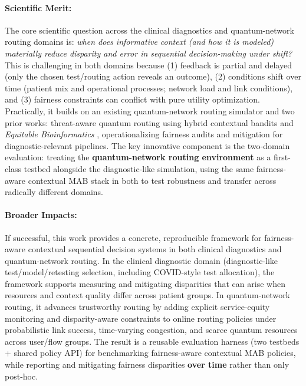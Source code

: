 \documentclass[12pt]{article}
\begin{document}
\paragraph{Scientific Merit:} \hspace{-5mm}
The core scientific question across the clinical diagnostics and quantum-network routing domains is: {\it when does informative context (and how it is modeled) materially reduce disparity and error in sequential decision-making under shift?} This is challenging in both domains because (1) feedback is partial and delayed (only the chosen test/routing action reveals an outcome), (2) conditions shift over time (patient mix and operational processes; network load and link conditions), and (3) fairness constraints can conflict with pure utility optimization. Practically, it builds on an existing quantum-network routing simulator and two prior works: threat-aware quantum routing using hybrid contextual bandits \cite{garcia2026threat_aware_quantum_routing} and {\it Equitable Bioinformatics} \cite{iste780_equitas}, operationalizing fairness audits and mitigation for diagnostic-relevant pipelines. The key innovative component is the two-domain evaluation: treating the {\bf quantum-network routing environment} as a first-class testbed alongside the diagnostic-like simulation, using the same fairness-aware contextual MAB stack in both to test robustness and transfer across radically different domains.


\paragraph{Broader Impacts:} \hspace{-5mm}
If successful, this work provides a concrete, reproducible framework for fairness-aware contextual sequential decision systems in both clinical diagnostics and quantum-network routing. In the clinical diagnostic domain (diagnostic-like test/model/retesting selection, including COVID-style test allocation), the framework supports measuring and mitigating disparities that can arise when resources and context quality differ across patient groups. In quantum-network routing, it advances trustworthy routing by adding explicit service-equity monitoring and disparity-aware constraints to online routing policies under probabilistic link success, time-varying congestion, and scarce quantum resources across user/flow groups. The result is a reusable evaluation harness (two testbeds + shared policy API) for benchmarking fairness-aware contextual MAB policies, while reporting and mitigating fairness disparities {\bf over time} rather than only post-hoc.
\end{document}
